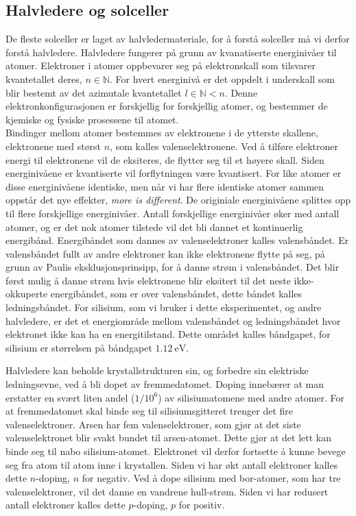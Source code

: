 \documentclass[%
 reprint,
 amsmath,amssymb,
 aps,
 norsk,
 booktabs
]{revtex4-1}
\begin{document}
\subsection{Halvledere og solceller}
De fleste solceller er laget av halvledermateriale, for å forstå solceller må vi derfor forstå halvledere. Halvledere fungerer på grunn av kvanatiserte energinivåer til atomer. Elektroner i atomer oppbevarer seg på elektronskall som tilsvarer kvantetallet deres, $n\in\mathbb{N}$. For hvert energinivå er det oppdelt i underskall som blir bestemt av det azimutale kvantetallet $l \in \mathbb{N} < n$. Denne elektronkonfigurasjonen er forskjellig for forskjellig atomer, og bestemmer de kjemiske og fysiske prosessene til atomet.\\
Bindinger mellom atomer bestemmes av elektronene i de ytterste skallene, elektronene med størst $n$, som kalles valenselektronene. Ved å tilføre elektroner energi til elektronene vil de eksiteres, de flytter seg til et høyere skall. Siden energinivåene er kvantiserte vil forflytningen være kvantisert. For like atomer er disse energinivåene identiske, men når vi har flere identiske atomer sammen oppstår det nye effekter, \textit{more is different}. De originiale energinivåene splittes opp til flere forskjellige energinivåer. Antall forskjellige energinivåer øker med antall atomer, og er det nok atomer tilstede vil det bli dannet et kontinuerlig energibånd. Energibåndet som dannes av valenselektroner kalles valensbåndet. Er valensbåndet fullt av andre elektroner kan ikke elektronene flytte på seg, på grunn av Paulis eksklusjonsprinsipp, for å danne strøm i valensbåndet. Det blir først mulig å danne strøm hvis elektronene blir eksitert til det neste ikke-okkuperte energibåndet, som er over valensbåndet, dette båndet kalles ledningsbåndet. For silisium, som vi bruker i dette eksperimentet, og andre halvledere, er det et energiområde mellom valensbåndet og ledningsbåndet hvor elektronet ikke kan ha en energitilstand. Dette området kalles båndgapet, for silisium er størrelsen på båndgapet $\SI{1.12}{\electronvolt}$.\par
Halvledere kan beholde krystallstrukturen sin, og forbedre sin elektriske ledningsevne, ved å bli dopet av fremmedatomet. Doping innebærer at man erstatter en svært liten andel ($1/10^6$) av silisiumatomene med andre atomer. For at fremmedatomet skal binde seg til silisiumsgitteret trenger det fire valenselektroner. Arsen har fem valenselektroner, som gjør at det siste valenselektronet blir svakt bundet til arsen-atomet. Dette gjør at det lett kan binde seg til nabo silisium-atomet. Elektronet vil derfor fortsette å kunne bevege seg fra atom til atom inne i krystallen. Siden vi har økt antall elektroner kalles dette $n$-doping, $n$ for negativ. Ved å dope silisium med bor-atomer, som har tre valenselektroner, vil det danne en vandrene hull-strøm. Siden vi har redusert antall elektroner kalles dette $p$-doping, $p$ for positiv.\\
\end{document}
